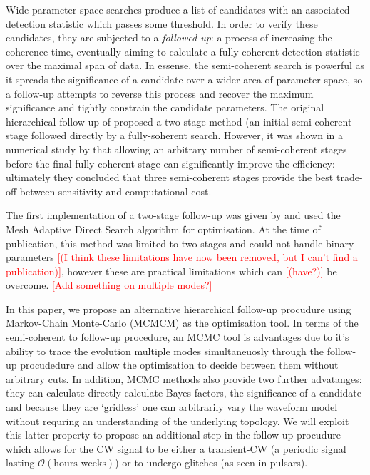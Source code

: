 \documentclass[aps, prd, twocolumn, superscriptaddress, floatfix, showpacs, nofootinbib, longbibliography]{revtex4-1}
\newcommand{\comment}[1]{\textcolor{red}{[#1]}}
\begin{document}
Wide parameter space searches produce a list of candidates with an associated
detection statistic which passes some threshold. In order to verify these
candidates, they are subjected to a \emph{followed-up}: a process of increasing
the coherence time, eventually aiming to calculate a fully-coherent detection
statistic over the maximal span of data. In essense, the semi-coherent search
is powerful as it spreads the significance of a candidate over a wider area of
parameter space, so a follow-up attempts to reverse this process and recover
the maximum significance and tightly constrain the candidate parameters. The
original hierarchical follow-up of \citet{brady2000} proposed a two-stage method
(an initial semi-coherent  stage followed directly by a fully-soherent search.
However, it was shown in a numerical study by \citet{cutler2005} that allowing
an arbitrary number of semi-coherent stages before the final fully-coherent
stage can significantly improve the efficiency: ultimately they concluded that
three semi-coherent stages provide the best trade-off between sensitivity and
computational cost.

The first implementation of a two-stage follow-up was given by
\citet{shaltev2013} and used the Mesh Adaptive Direct Search algorithm for
optimisation. At the time of publication, this method was limited to two stages
and could not handle binary parameters \comment{(I think these limitations have
now been removed, but I can't find a publication)}, however these are practical
limitations which can \comment{(have?)} be overcome.
\comment{Add something on multiple modes?}

In this paper, we propose an alternative hierarchical follow-up procudure using
Markov-Chain Monte-Carlo (MCMCM) as the optimisation tool. In terms of the
semi-coherent to follow-up procedure, an MCMC tool is advantages due to it's
ability to trace the evolution multiple modes simultaneuosly through the
follow-up procudedure and allow the optimisation to decide between them without
arbitrary cuts. In addition, MCMC methods also provide two further
advatanges: they can calculate directly calculate Bayes factors, the significance
of a candidate and because they are `gridless' one can arbitrarily vary the
waveform model without requring an understanding of the underlying topology.
We will exploit this latter property to propose an additional step in the
follow-up procudure which allows for the CW signal to be either a transient-CW
(a periodic signal lasting $\mathcal{O}(\textrm{hours-weeks})$) or to undergo
glitches (as seen in pulsars).
\end{document}
